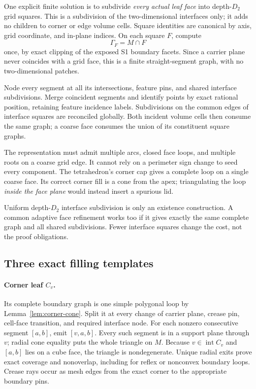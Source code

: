 \documentclass[11pt]{article}
\theoremstyle{definition}
\theoremstyle{remark}
\newcommand{\intr}{\operatorname{int}}
\begin{document}
One explicit finite solution is to subdivide \emph{every actual leaf
face} into depth-$D_2$ grid squares. This is a subdivision of the
two-dimensional interfaces only; it adds no children to corner or edge
volume cells. Square identities are canonical by axis, grid coordinate,
and in-plane indices. On each square $F$, compute
\[
  \Gamma_F=M\cap F
\]
once, by exact clipping of the exposed S1 boundary facets. Since a
carrier plane never coincides with a grid face, this is a finite
straight-segment graph, with no two-dimensional patches.

Node every segment at all its intersections, feature pins, and shared
interface subdivisions. Merge coincident segments and identify points
by exact rational position, retaining feature incidence labels.
Subdivisions on the common edges of interface squares are reconciled
globally. Both incident volume cells then consume the same graph;
a coarse face consumes the union of its constituent square graphs.

The representation must admit multiple arcs, closed face loops, and
multiple roots on a coarse grid edge. It cannot rely on a perimeter
sign change to seed every component. The tetrahedron's corner cap
gives a complete loop on a single coarse face. Its correct corner
fill is a cone from the apex; triangulating the loop \emph{inside the
face plane} would instead insert a spurious lid.

Uniform depth-$D_2$ interface subdivision is only an existence
construction. A common adaptive face refinement works too if it
gives exactly the same complete graph and all shared subdivisions.
Fewer interface squares change the cost, not the proof obligations.

\subsection{Three exact filling templates}

\paragraph{Corner leaf $C_v$.}
Its complete boundary graph is one simple polygonal loop by
Lemma~\ref{lem:corner-cone}. Split it at every change of carrier plane,
crease pin, cell-face transition, and required interface node. For
each nonzero consecutive segment $[a,b]$, emit $[v,a,b]$.
Every such segment is in a support plane through $v$; radial cone
equality puts the whole triangle on $M$. Because $v\in\intr C_v$
and $[a,b]$ lies on a cube face, the triangle is nondegenerate. Unique
radial exits prove exact coverage and nonoverlap, including for
reflex or nonconvex boundary loops. Crease rays occur as mesh edges
from the exact corner to the appropriate boundary pins.
\end{document}
